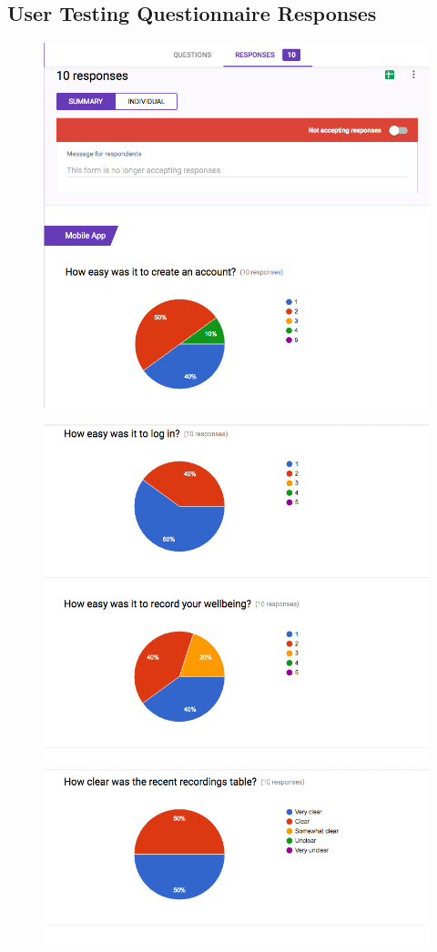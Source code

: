 \documentclass[11pt,openright,a4paper]{report}
\begin{document}
\begin{appendices}
\section{User Testing Questionnaire Responses} \label{app:testing:results}
\begin{figure}[ht]
  \centering
  \includegraphics[width=.9\textwidth]{i/testingresponses1.png}
\end{figure}

\begin{figure}[ht]
  \centering
  \includegraphics[width=.9\textwidth]{i/testingresponses2.png}
  \includegraphics[width=.9\textwidth]{i/testingresponses3.png}
\end{figure}


\end{appendices}
\end{document}
